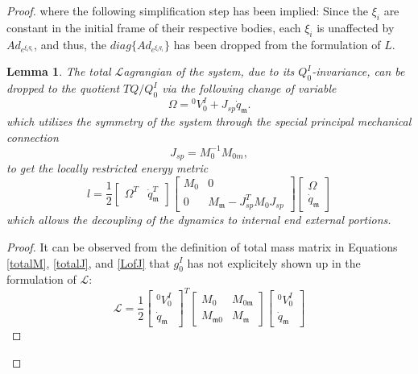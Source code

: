 \documentclass[lettersize,journal]{IEEEtran}
\def \L {\mathcal{L}}
\newtheorem{lemma}[theorem]{Lemma}
\begin{document}
\begin{proof}[Proof]
where the following simplification step has been implied: Since the $\xi_i$ are constant in the initial frame of their respective bodies, each $\xi_i$ is unaffected by $Ad_{e^{\xi_iq_i}}$, and thus, the $diag\{Ad_{e^{\xi_iq_i}}\}$ has been dropped from the formulation of $L$. 
\begin{lemma}
The total $\L$agrangian of the system, due to its $Q^I_0$-invariance, can be dropped to the quotient $TQ/Q^I_0$ via the following change of variable
\begin{equation}
\Omega={}^0V_0^I+J_{sp}\dot{q}_\mathfrak{m}.\label{omega}
\end{equation}
which utilizes the symmetry of the system through the special principal mechanical connection
\begin{equation}
  J_{sp}= M_0^{-1}M_{0m},
\end{equation}
to get the locally restricted energy metric
\begin{equation}
    l=\frac{1}{2}\begin{bmatrix}\Omega^T&\dot{q}_\mathfrak{m}^T\end{bmatrix} \begin{bmatrix}M_0 & 0\\ 0 & M_\mathfrak{m}-J_{sp}^TM_0J_{sp}\end{bmatrix} \begin{bmatrix}\Omega\\\dot{q}_\mathfrak{m}\end{bmatrix}
\end{equation}
which allows the decoupling of the dynamics to internal end external portions.
\end{lemma}
\begin{proof}[Proof]
It can be observed from the definition of total mass matrix in Equations \ref{totalM}, \ref{totalJ}, and \ref{LofJ} that $g^I_0$ has not explicitely shown up in the formulation of $\mathcal{L}$:
\begin{equation}
    \L=\frac{1}{2}\begin{bmatrix}^0V^I_0 \\ \dot{q}_\mathfrak{m}\end{bmatrix}^T \begin{bmatrix} M_0 & M_{0\mathfrak{m}} \\ M_{\mathfrak{m}0} & M_\mathfrak{m} \end{bmatrix} \begin{bmatrix}^0V^I_0\\\dot{q}_\mathfrak{m}\end{bmatrix}

\end{equation}
\end{proof}
\end{proof}
\end{document}
